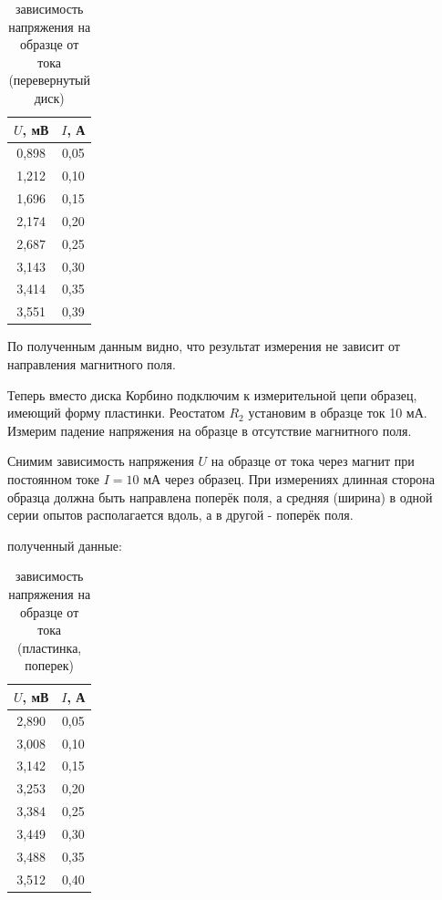 \documentclass[a4paper, 12pt]{article}%
\begin{document}
\begin{table}[!h]
\begin{center}
\begin{tabular}{|c|c|}
\hline $U$, мВ & $I$, А\\
\hline 0,898 & 0,05 \\
\hline 1,212 & 0,10 \\
\hline 1,696 & 0,15 \\
\hline 2,174 & 0,20 \\
\hline 2,687 & 0,25 \\
\hline 3,143 & 0,30 \\
\hline 3,414 & 0,35 \\
\hline 3,551 & 0,39 \\
\hline
\end{tabular}
\end{center}
\caption{зависимость напряжения на образце от тока (перевернутый диск)}
\end{table}


По полученным данным видно, что результат измерения не зависит от направления магнитного поля. 



Теперь  вместо диска Корбино подключим к измерительной цепи образец, имеющий форму пластинки. Реостатом $R_{2}$ установим в образце ток 10 мА. Измерим падение напряжения на образце в отсутствие магнитного поля.


Снимим зависимость напряжения $U$ на образце от тока через магнит при постоянном токе $I=10$ мА через образец. При измерениях длинная сторона образца должна быть направлена поперёк поля, а средняя (ширина) в одной серии опытов располагается вдоль, а в другой - поперёк поля.

полученный данные: 

\begin{table}[!h]
\begin{center}
\begin{tabular}{|c|c|}
\hline	$U$, мВ  & $I$, А  \\
\hline 2,890 & 0,05 \\
\hline 3,008 & 0,10 \\
\hline 3,142 & 0,15 \\
\hline 3,253 & 0,20 \\
\hline 3,384 & 0,25 \\
\hline 3,449 & 0,30 \\
\hline 3,488 & 0,35 \\
\hline 3,512 & 0,40 \\
\hline
\end{tabular}
\end{center}
\caption{зависимость напряжения на образце от тока (пластинка, поперек)}
\end{table}
\end{document}
